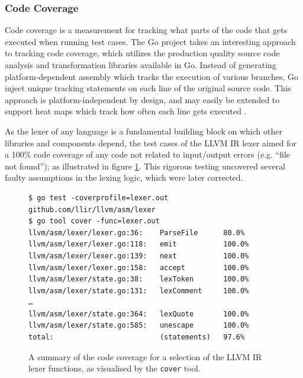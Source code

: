 
\subsubsection{Code Coverage}
\label{sec:ver_code_coverage}

Code coverage is a measurement for tracking what parts of the code that gets executed when running test cases. The Go project takes an interesting approach to tracking code coverage, which utilizes the production quality source code analysis and transformation libraries available in Go. Instead of generating platform-dependent assembly which tracks the execution of various branches, Go inject unique tracking statements on each line of the original source code. This approach is platform-independent by design, and may easily be extended to support heat maps which track how often each line gets executed \cite{go_cover}.

As the lexer of any language is a fundamental building block on which other libraries and components depend, the test cases of the LLVM IR lexer aimed for a 100\% code coverage of any code not related to input/output errors (e.g. ``file not found''); as illustrated in figure \ref{fig:lexer_code_coverage}. This rigorous testing uncovered several faulty assumptions in the lexing logic, which were later corrected.

\begin{figure}[htbp]
	\begin{center}
		\begin{verbatim}
$ go test -coverprofile=lexer.out github.com/llir/llvm/asm/lexer
$ go tool cover -func=lexer.out
llvm/asm/lexer/lexer.go:36:    ParseFile      80.0%
llvm/asm/lexer/lexer.go:118:   emit           100.0%
llvm/asm/lexer/lexer.go:139:   next           100.0%
llvm/asm/lexer/lexer.go:158:   accept         100.0%
llvm/asm/lexer/state.go:38:    lexToken       100.0%
llvm/asm/lexer/state.go:131:   lexComment     100.0%
…
llvm/asm/lexer/state.go:364:   lexQuote       100.0%
llvm/asm/lexer/state.go:585:   unescape       100.0%
total:                         (statements)   97.6%
		\end{verbatim}
		\caption{A summary of the code coverage for a selection of the LLVM IR lexer functions, as visualised by the \texttt{cover} tool.}
		\label{fig:lexer_code_coverage}
	\end{center}
\end{figure}

